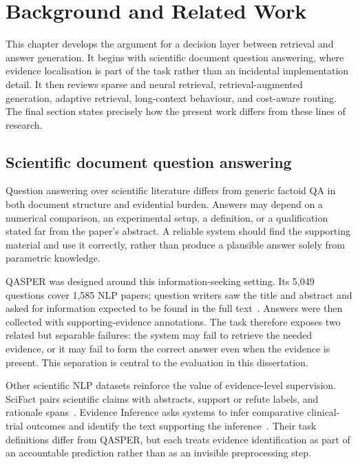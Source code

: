 \chapter{Background and Related Work}
\label{chap:background}

This chapter develops the argument for a decision layer between retrieval and answer generation. It begins with scientific document question answering, where evidence localisation is part of the task rather than an incidental implementation detail. It then reviews sparse and neural retrieval, retrieval-augmented generation, adaptive retrieval, long-context behaviour, and cost-aware routing. The final section states precisely how the present work differs from these lines of research.

\section{Scientific document question answering}

Question answering over scientific literature differs from generic factoid QA in both document structure and evidential burden. Answers may depend on a numerical comparison, an experimental setup, a definition, or a qualification stated far from the paper's abstract. A reliable system should find the supporting material and use it correctly, rather than produce a plausible answer solely from parametric knowledge.

QASPER was designed around this information-seeking setting. Its 5,049 questions cover 1,585 NLP papers; question writers saw the title and abstract and asked for information expected to be found in the full text~\cite{dasigi2021qasper}. Answers were then collected with supporting-evidence annotations. The task therefore exposes two related but separable failures: the system may fail to retrieve the needed evidence, or it may fail to form the correct answer even when the evidence is present. This separation is central to the evaluation in this dissertation.

Other scientific NLP datasets reinforce the value of evidence-level supervision. SciFact pairs scientific claims with abstracts, support or refute labels, and rationale spans~\cite{wadden2020scifact}. Evidence Inference asks systems to infer comparative clinical-trial outcomes and identify the text supporting the inference~\cite{deyoung2020evidence}. Their task definitions differ from QASPER, but each treats evidence identification as part of an accountable prediction rather than as an invisible preprocessing step.

